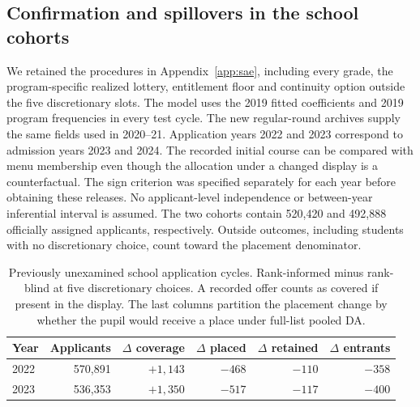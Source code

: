 \subsection{Confirmation and spillovers in the school cohorts}\label{app:sae-fresh}
We retained the procedures in Appendix~\ref{app:sae}, including every grade, the program-specific realized lottery, entitlement floor and continuity option outside the five discretionary slots. The model uses the 2019 fitted coefficients and 2019 program frequencies in every test cycle. The new regular-round archives supply the same fields used in 2020--21. Application years 2022 and 2023 correspond to admission years 2023 and 2024. The recorded initial course can be compared with menu membership even though the allocation under a changed display is a counterfactual. The sign criterion was specified separately for each year before obtaining these releases. No applicant-level independence or between-year inferential interval is assumed. The two cohorts contain 520,420 and 492,888 officially assigned applicants, respectively. Outside outcomes, including students with no discretionary choice, count toward the placement denominator.

\begin{table}[t]\centering\small
\caption{Previously unexamined school application cycles. Rank-informed minus rank-blind at five discretionary choices. A recorded offer counts as covered if present in the display. The last columns partition the placement change by whether the pupil would receive a place under full-list pooled DA.}
\label{tab:sae-later}
\begin{tabular}{@{}lrrrrr@{}}\toprule
Year & Applicants & $\Delta$ coverage & $\Delta$ placed & $\Delta$ retained & $\Delta$ entrants\\\midrule
2022 & 570,891 & $+1,143$ & $-468$ & $-110$ & $-358$\\
2023 & 536,353 & $+1,350$ & $-517$ & $-117$ & $-400$\\\bottomrule
\end{tabular}\end{table}

